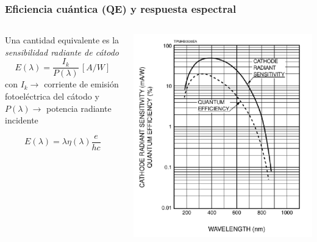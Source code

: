 \documentclass{beamer}
\begin{document}
\begin{frame}
\frametitle{Eficiencia cuántica (QE) y respuesta espectral}
\begin{columns}
\begin{column}{0.6\textwidth}
Una cantidad equivalente es la \alert{\textit{sensibilidad radiante de cátodo}}
$$E(\lambda) = \frac{I_k}{P(\lambda)}\, [A/W]$$
con $I_k \rightarrow$ corriente de emisión fotoeléctrica del cátodo y
$P(\lambda) \rightarrow$ potencia radiante incidente   

$$E(\lambda) = \lambda \eta(\lambda) \frac{e}{hc}$$
\end{column}
\begin{column}{0.4\textwidth}
\begin{center}
\includegraphics[width=\textwidth]{d1/respuesta_espectral_r1463}
\end{center}
\end{column}
\end{columns}
\end{frame}
\end{document}

